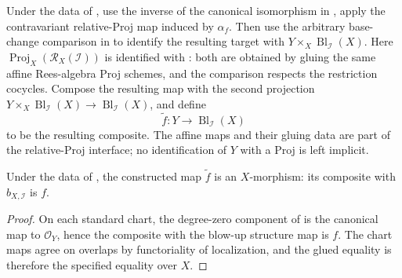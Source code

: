 \begin{definition}
  \label{def:nagata-blowup-universal-lift}

  Under the data of
  , use the inverse of the canonical isomorphism in
  , apply the
  contravariant relative-Proj map induced by $\alpha_f$.  Then use the
  arbitrary base-change comparison in
   to identify the
  resulting target with $Y\times_X\operatorname{Bl}_{\mathcal I}(X)$.  Here
  $\operatorname{Proj}_X(\mathcal R_X(\mathcal I))$ is identified with
  : both are obtained by gluing the same affine
  Rees-algebra Proj schemes, and the comparison respects the restriction
  cocycles.  Compose
  the resulting map with the second projection
  $Y\times_X\operatorname{Bl}_{\mathcal I}(X)\to
  \operatorname{Bl}_{\mathcal I}(X)$, and
  define
  \[
    \widetilde f\colon Y\longrightarrow\operatorname{Bl}_{\mathcal I}(X)
  \]
  to be the resulting composite.  The affine maps and their gluing data are
  part of the relative-Proj interface; no identification of $Y$ with a Proj
  is left implicit.
\end{definition}

\begin{lemma}
  \label{lemma:nagata-blowup-universal-exists}

  Under the data of , the constructed
  map $\widetilde f$ is an $X$-morphism: its composite with
  $b_{X,\mathcal I}$ is $f$.
\end{lemma}

\begin{proof}
  On each standard chart, the degree-zero component of
   is the canonical map to
  $\mathcal O_Y$, hence the composite with the blow-up structure map is $f$.
  The chart maps agree on overlaps by functoriality of localization, and the
  glued equality is therefore the specified equality over $X$.
\end{proof}

